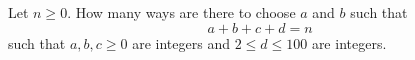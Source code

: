 Let $n \geq 0$.
How many ways are there to choose $a$ and $b$ such that
\[
a + b + c + d = n
\]
such that $a, b, c \geq 0$ are integers 
and $2 \leq d \leq 100$ are integers. 
